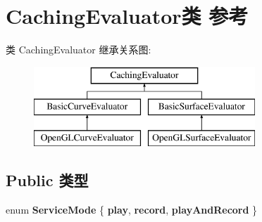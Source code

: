 \hypertarget{class_caching_evaluator}{}\section{Caching\+Evaluator类 参考}
\label{class_caching_evaluator}
类 Caching\+Evaluator 继承关系图\+:\begin{figure}[H]
\begin{center}
\leavevmode
\includegraphics[height=3.000000cm]{class_caching_evaluator}
\end{center}
\end{figure}
\subsection*{Public 类型}
\begin{DoxyCompactItemize}
\item 
\mbox{\label{class_caching_evaluator_abfb9a3cc0841120ab13cfd64fb0f0bf2}} 
enum {\bfseries Service\+Mode} \{ {\bfseries play}, 
{\bfseries record}, 
{\bfseries play\+And\+Record}
 \}
\end{DoxyCompactItemize}
